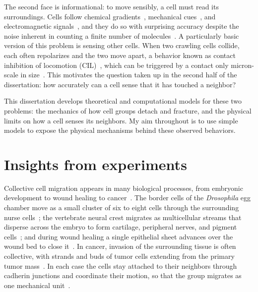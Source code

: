 The second face is informational: to move sensibly, a cell must read its surroundings.
Cells follow chemical gradients~\cite{camley2016emergent, ipina2022collective}, mechanical cues~\cite{pallares2023stiffness}, and electromagnetic signals~\cite{sun2023electric, nwogbaga2023physical}, and they do so with surprising accuracy despite the noise inherent in counting a finite number of molecules~\cite{berg1977physics}.
A particularly basic version of this problem is sensing other cells.
When two crawling cells collide, each often repolarizes and the two move apart, a behavior known as contact inhibition of locomotion (CIL)~\cite{abercrombie1970contact, mayor2010keeping}, which can be triggered by a contact only micron-scale in size~\cite{singh2021rules}.
This motivates the question taken up in the second half of the dissertation: how accurately can a cell sense that it has touched a neighbor?

This dissertation develops theoretical and computational models for these two problems: the mechanics of how cell groups detach and fracture, and the physical limits on how a cell senses its neighbors.
My aim throughout is to use simple models to expose the physical mechanisms behind these observed behaviors.


\section{Insights from experiments}
\label{sec:ch1:experiments}

Collective cell migration appears in many biological processes, from embryonic development to wound healing to cancer~\cite{friedl2009collective, cheung2025collective}.
The border cells of the \textit{Drosophila} egg chamber move as a small cluster of six to eight cells through the surrounding nurse cells~\cite{montell2012group}; the vertebrate neural crest migrates as multicellular streams that disperse across the embryo to form cartilage, peripheral nerves, and pigment cells~\cite{scarpa2016collective}; and during wound healing a single epithelial sheet advances over the wound bed to close it~\cite{poujade2007collective}.
In cancer, invasion of the surrounding tissue is often collective, with strands and buds of tumor cells extending from the primary tumor mass~\cite{cheung2025collective, friedl2009collective}.
In each case the cells stay attached to their neighbors through cadherin junctions and coordinate their motion, so that the group migrates as one mechanical unit~\cite{friedl2009collective}.

